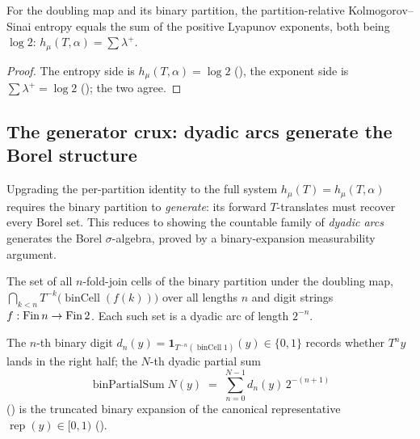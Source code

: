 \begin{theorem}\label{pesin_identity_doublingMap_perPartition}
  \leanok
  For the doubling map and its binary partition, the partition-relative Kolmogorov--Sinai entropy
  equals the sum of the positive Lyapunov exponents, both being \(\log 2\):
  \(h_\mu(T,\alpha)=\sum\lambda^{+}\).
\end{theorem}
\begin{proof}\leanok
  The entropy side is \(h_\mu(T,\alpha)=\log 2\)
  (), the exponent side is
  \(\sum\lambda^{+}=\log 2\) (); the two agree.
\end{proof}

\subsection*{The generator crux: dyadic arcs generate the Borel structure}

Upgrading the per-partition identity to the full system \(h_\mu(T)=h_\mu(T,\alpha)\) requires the
binary partition to \emph{generate}: its forward \(T\)-translates must recover every Borel set. This
reduces to showing the countable family of \emph{dyadic arcs} generates the Borel
\(\sigma\)-algebra, proved by a binary-expansion measurability argument.

\begin{definition}\label{dyadicArcSet}
  \leanok
  The set of all \(n\)-fold-join cells of the binary partition under the doubling map,
  \(\bigcap_{k<n}T^{-k}\bigl(\operatorname{binCell}(f(k))\bigr)\) over all lengths \(n\) and digit
  strings \(f:\operatorname{Fin} n\to\operatorname{Fin} 2\). Each such set is a dyadic arc of length \(2^{-n}\).
\end{definition}

\begin{definition}\label{binDigit}
  \leanok
  The \(n\)-th binary digit \(d_n(y)=\mathbf 1_{T^{-n}(\operatorname{binCell}1)}(y)\in\{0,1\}\)
  records whether \(T^n y\) lands in the right half; the \(N\)-th dyadic partial sum
  \[
    \operatorname{binPartialSum}N(y)
      \;=\; \sum_{n=0}^{N-1} d_n(y)\,2^{-(n+1)}
  \]
  () is the truncated binary expansion of the
  canonical representative \(\operatorname{rep}(y)\in[0,1)\) ().
\end{definition}

